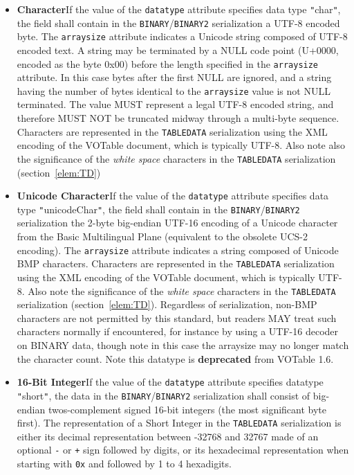 \documentclass[11pt,a4paper]{ivoa}
\def\Arefs#1{section~\ref{#1}}
\let\fg=\color
\def\attr#1{{\tt{\fg{DarkRed}#1}}}
\def\elem#1{{\tt{\fg{DarkRed}#1}}}
\def\literalvalue#1{{\tt"}{{\fg{DarkPurple}#1}}{\tt"}}
\begin{document}
{\begin{itemize}
\item {\bf Character}\quad If the value of the {\attr{datatype}}
attribute specifies data type {\literalvalue{char}},
the field shall contain in the \elem{BINARY}/\elem{BINARY2} serialization
a UTF-8 encoded byte.
The \attr{arraysize} attribute
indicates a Unicode string composed of UTF-8 encoded text.
A string may be terminated by a NULL code point
(U+0000, encoded as the byte 0x00)
before the length specified in the \attr{arraysize} attribute.
In this case bytes after the first NULL are ignored,
and a string having the number of bytes identical to
the \attr{arraysize} value is not NULL terminated.
The value MUST represent a legal UTF-8 encoded string,
and therefore MUST NOT be truncated midway through a multi-byte sequence.
Characters are represented in the \elem{TABLEDATA} serialization
using the XML encoding of the VOTable document, which is typically UTF-8.
Also note also the significance of the {\em white space} characters
in the \elem{TABLEDATA} serialization
(\Arefs{elem:TD})

\item {\bf Unicode Character}\quad If the value of the {\attr{datatype}}
attribute specifies data type {\literalvalue{unicodeChar}},
the field shall contain in the \elem{BINARY}/\elem{BINARY2} serialization
the 2-byte big-endian UTF-16 encoding
of a Unicode character from the Basic Multilingual Plane
(equivalent to the obsolete UCS-2 encoding).
The \attr{arraysize} attribute
indicates a string composed of Unicode BMP characters.
Characters are represented in the \elem{TABLEDATA} serialization
using the XML encoding of the VOTable document, which is typically UTF-8.
Also note the significance of the {\em white space} characters
in the \elem{TABLEDATA} serialization
(\Arefs{elem:TD}).
Regardless of serialization, non-BMP characters are not permitted
by this standard, but readers MAY treat such characters normally
if encountered, for instance by using a UTF-16 decoder on BINARY data,
though note in this case the arraysize may no longer match the character count.
Note this datatype is {\bf deprecated} from VOTable 1.6.

\item {\bf 16-Bit Integer}\quad If the value of the {\attr{datatype}}
attribute specifies datatype {\literalvalue{short}},
the data in the \elem{BINARY}/\elem{BINARY2} serialization shall consist of
big-endian twos-complement signed 16-bit integers
(the most significant byte first).
The representation of a Short Integer in the \elem{TABLEDATA} serialization
is either its decimal representation between -32768 and 32767
   made of an optional {\tt-} or {\tt+} sign followed by digits,
   or its hexadecimal representation when starting with {\tt0x}
   and followed by 1 to 4 hexadigits.


\end{itemize}}
\end{document}
